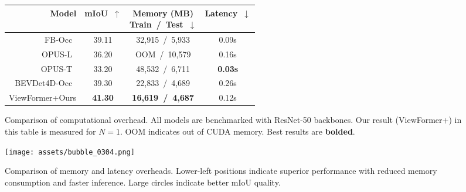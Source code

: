 \begin{figure}[htbp]
    \centering
    \begin{minipage}{0.48\textwidth}
        \footnotesize
        \begin{tabular}{r|ccc}
            \toprule
            Model & mIoU~$\uparrow$ & \makecell{Memory (MB)\\ Train~/~Test}~$\downarrow$ & Latency~$\downarrow$ \\
            \midrule
            FB-Occ~\cite{fb_occ} & 39.11 & 32,915~/~5,933 & 0.09s \\
            OPUS-L~\cite{opus} & 36.20 & OOM~/~10,579 & 0.16s \\
            OPUS-T~\cite{opus} & 33.20 & 48,532~/~6,711 & \textbf{0.03s} \\
            BEVDet4D-Occ~\cite{bevdet4d} & 39.30 & 22,833~/~4,689 & 0.26s \\
            \midrule
            ViewFormer+Ours & \textbf{41.30} & \textbf{16,619~/~4,687} & 0.12s \\
            \bottomrule
        \end{tabular}
        \vspace{2mm}
        \caption{Comparison of computational overhead. All models are benchmarked with ResNet-50 backbones. Our result (ViewFormer+\ours) in this table is measured for $N = 1$. OOM indicates out of CUDA memory. Best results are \textbf{bolded}.}
        \label{tab:efficiency}
    \end{minipage}\hfill
    \begin{minipage}{0.48\textwidth}
        \centering
        \texttt{[image: assets/bubble\_0304.png]}  %
        \caption{Comparison of memory and latency overheads. Lower-left positions indicate superior performance with reduced memory consumption and faster inference. Large circles indicate better mIoU quality.}
        \label{fig:bubble}
    \end{minipage}
\end{figure}



